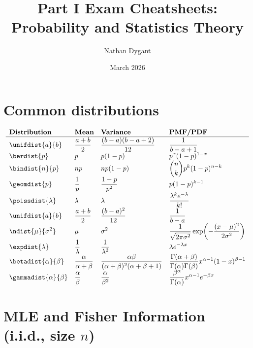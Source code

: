 \documentclass[a4paper]{article}
\title{Part I Exam Cheatsheets:\\Probability and Statistics Theory}
\author{Nathan Dygant}
\date{March 2026}
\begin{document}
\maketitle

\section{Common distributions}
{
\renewcommand*{\arraystretch}{2.25}
\[
\begin{array}{*4{>{\displaystyle}l}}
\textbf{Distribution} & \textbf{Mean} & \textbf{Variance} & \textbf{PMF/PDF} \\ \hline
\unifdist{a}{b} & \frac{a+b}{2} & \frac{(b-a)(b-a+2)}{12} & \frac{1}{b-a+1} \\
\berdist{p} & p & p(1-p) & p^x(1-p)^{1-x} \\
\bindist{n}{p} & np & np(1-p) & \binom{n}{k}p^k(1-p)^{n-k} \\
\geomdist{p} & \frac1p & \frac{1-p}{p^2} & p(1-p)^{k-1} \\
\poissdist{\lambda} & \lambda & \lambda & \frac{\lambda^k e^{-\lambda}}{k!} \\
\unifdist{a}{b} & \frac{a+b}{2} & \frac{(b-a)^2}{12} & \frac{1}{b-a} \\
\ndist{\mu}{\sigma^2} & \mu & \sigma^2 &
\frac{1}{\sqrt{2\pi\sigma^2}}
\exp\!\left(-\frac{(x-\mu)^2}{2\sigma^2}\right) \\
\expdist{\lambda} & \frac1\lambda & \frac1{\lambda^2} & \lambda e^{-\lambda x} \\
\betadist{\alpha}{\beta} &
\frac{\alpha}{\alpha+\beta} &
\frac{\alpha\beta}{(\alpha+\beta)^2(\alpha+\beta+1)} &
\frac{\Gamma(\alpha+\beta)}{\Gamma(\alpha)\Gamma(\beta)}
x^{\alpha-1}(1-x)^{\beta-1} \\
\gammadist{\alpha}{\beta} &
\frac{\alpha}{\beta} &
\frac{\alpha}{\beta^2} &
\frac{\beta^\alpha}{\Gamma(\alpha)}x^{\alpha-1}e^{-\beta x}
\end{array}
\]
}

\section{MLE and Fisher Information (i.i.d., size $n$)}
\end{document}
